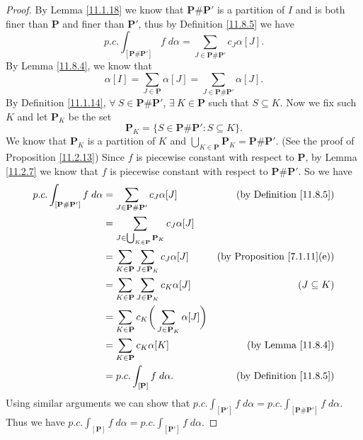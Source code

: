 \begin{proof}
    By Lemma \ref{11.1.18} we know that \(\mathbf{P} \# \mathbf{P}'\) is a partition of \(I\) and is both finer than \(\mathbf{P}\) and finer than \(\mathbf{P}'\), thus by Definition \ref{11.8.5} we have
    \[
        p.c. \int_{[\mathbf{P} \# \mathbf{P}']} f \; d \alpha = \sum_{J \in \mathbf{P} \# \mathbf{P}'} c_J \alpha[J].
    \]
    By Lemma \ref{11.8.4}, we know that
    \[
        \alpha[I] = \sum_{J \in \mathbf{P}} \alpha[J] = \sum_{J \in \mathbf{P} \# \mathbf{P}'} \alpha[J].
    \]
    By Definition \ref{11.1.14}, \(\forall\ S \in \mathbf{P} \# \mathbf{P}'\), \(\exists\ K \in \mathbf{P}\) such that \(S \subseteq K\).
    Now we fix such \(K\) and let \(\mathbf{P}_K\) be the set
    \[
        \mathbf{P}_K = \{S \in \mathbf{P} \# \mathbf{P}' : S \subseteq K\}.
    \]
    We know that \(\mathbf{P}_K\) is a partition of \(K\) and \(\bigcup_{K \in \mathbf{P}} \mathbf{P}_K = \mathbf{P} \# \mathbf{P}'\).
    (See the proof of Proposition \ref{11.2.13})
    Since \(f\) is piecewise constant with respect to \(\mathbf{P}\), by Lemma \ref{11.2.7} we know that \(f\) is piecewise constant with respect to \(\mathbf{P} \# \mathbf{P}'\).
    So we have
    \begin{align*}
        p.c. \int_{[\mathbf{P} \# \mathbf{P}']} f \; d \alpha & = \sum_{J \in \mathbf{P} \# \mathbf{P}'} c_J \alpha[J]                        & \text{(by Definition \ref{11.8.5})}     \\
                                                              & = \sum_{J \in \bigcup_{K \in \mathbf{P}} \mathbf{P}_K} c_J \alpha[J]                                                    \\
                                                              & = \sum_{K \in \mathbf{P}} \sum_{J \in \mathbf{P}_K} c_J \alpha[J]             & \text{(by Proposition \ref{7.1.11}(e))} \\
                                                              & = \sum_{K \in \mathbf{P}} \sum_{J \in \mathbf{P}_K} c_K \alpha[J]             & (J \subseteq K)                         \\
                                                              & = \sum_{K \in \mathbf{P}} c_K \bigg(\sum_{J \in \mathbf{P}_K} \alpha[J]\bigg)                                           \\
                                                              & = \sum_{K \in \mathbf{P}} c_K \alpha[K]                                       & \text{(by Lemma \ref{11.8.4})}          \\
                                                              & = p.c. \int_{[\mathbf{P}]} f \; d \alpha.                                     & \text{(by Definition \ref{11.8.5})}
    \end{align*}
    Using similar arguments we can show that \(p.c. \int_{[\mathbf{P}']} f \; d \alpha = p.c. \int_{[\mathbf{P} \# \mathbf{P}']} f \; d \alpha\).
    Thus we have \(p.c. \int_{[\mathbf{P}]} f \; d \alpha = p.c. \int_{[\mathbf{P}']} f \; d \alpha\).
\end{proof}

